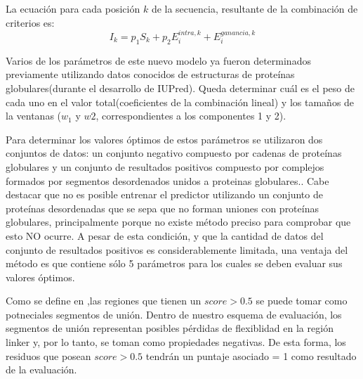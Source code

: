 La ecuación para cada posición $k$ de la secuencia, resultante de la combinación de criterios es:
\begin{equation}\label{scorefinal}
I_k = p_1S_k + p_2E_i^{intra,k} + E_i^{ganancia,k}
\end{equation}


Varios de los parámetros de este nuevo modelo ya fueron determinados previamente utilizando datos conocidos de estructuras de proteínas globulares(durante el desarrollo de IUPred).
Queda determinar cuál es el peso de cada uno en el valor total(coeficientes de la combinación lineal) y los tamaños de la ventanas ($w_1$ y $w2$, correspondientes a los componentes 1 y 2).

Para determinar los valores óptimos de estos parámetros se utilizaron dos conjuntos de datos: un conjunto negativo compuesto por cadenas de proteínas globulares y un conjunto de resultados positivos compuesto por complejos formados por segmentos desordenados unidos a proteinas globulares..
Cabe destacar que no es posible entrenar el predictor utilizando un conjunto de proteínas desordenadas que se sepa que no forman uniones con proteínas globulares, 
principalmente porque no existe método preciso para comprobar que esto NO ocurre. 
A pesar de esta condición, y que la cantidad de datos del conjunto de resultados positivos es considerablemente limitada, una ventaja del método es que contiene sólo 5 parámetros para los cuales se deben evaluar sus valores óptimos. 


Como se define en \cite{dosztanyi2009anchor},las regiones que tienen un $score>0.5$ se puede tomar como potneciales segmentos de unión.
Dentro de nuestro esquema de evaluación, los segmentos de unión representan posibles pérdidas de flexiblidad en la región linker y, por lo tanto, se toman como propiedades negativas.
De esta forma, los residuos que posean $score>0.5$ tendrán un puntaje asociado = 1 como resultado de la evaluación.

